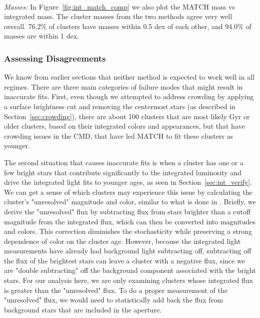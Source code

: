 \documentclass{emulateapj}
\begin{document}
\begin{figure*}[!htbp]
\centering
\mbox{}
\\
\mbox{}
\caption{Comparison of MATCH best fit results to integrated light expectation value.  Top left panel is age, top right is mass, bottom is $A_V$.  All plots have uncertainties in the PDFs incorporated by Monte Carlo sampling of the PDF.}
\label{fig:int_match_comp}
\end{figure*}


{\emph {Masses:}}
In Figure~\ref{fig:int_match_comp} we also plot the MATCH mass vs integrated mass.  The cluster masses from the two methods agree very well overall.  76.2\% of clusters have masses within 0.5 dex of each other, and 94.0\% of masses are within 1 dex.  

\subsubsection{Assessing Disagreements}\label{sec:disagree}
We know from earlier sections that neither method is expected to work well in all regimes.  There are three main categories of failure modes that might result in inaccurate fits.  First, even though we attempted to address crowding by applying a surface brightness cut and removing the centermost stars (as described in Section~\ref{sec:crowding}), there are about 100 clusters that are most likely Gyr or older clusters, based on their integrated colors and appearances, but that have crowding issues in the CMD, that have led MATCH to fit these clusters as younger.

The second situation that causes inaccurate fits is when a cluster has one or a few bright stars that contribute significantly to the integrated luminosity and drive the integrated light fits to younger ages, as seen in Section~\ref{sec:int_verify}.  We can get a sense of which clusters may experience this issue by calculating the cluster's "unresolved" magnitude and color, similar to what is done in \cite{Beerman12}.  Briefly, we derive the "unresolved" flux by subtracting flux from stars brighter than a cutoff magnitude from the integrated flux, which can then be converted into magnitudes and colors.  This correction diminishes the stochasticity while preserving a strong dependence of color on the cluster age.  However, because the integrated light measurements have already had background light subtracting off, subtracting off the flux of the brightest stars can leave a cluster with a negative flux, since we are "double subtracting" off the background component associated with the bright stars.  For our analysis here, we are only examining clusters whose integrated flux is greater than the "unresolved" flux.  To do a proper measurement of the "unresolved" flux, we would need to statistically add back the flux from background stars that are included in the aperture.  
\end{document}
